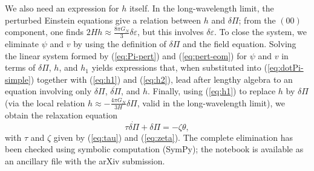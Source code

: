 \documentclass[aps,prd,reprint,superscriptaddress,floatfix]{revtex4-2}
\begin{document}
We also need an expression for $h$ itself. In the long-wavelength limit, the perturbed Einstein equations give a relation between $h$ and $\delta\Pi$; from the $(00)$ component, one finds $2H h \approx \frac{8\pi G_N}{3} \delta\varepsilon$, but this involves $\delta\varepsilon$. To close the system, we eliminate $\psi$ and $v$ by using the definition of $\delta\Pi$ and the field equation. Solving the linear system formed by (\ref{eq:Pi-pert}) and (\ref{eq:pert-eom}) for $\psi$ and $v$ in terms of $\delta\Pi$, $h$, and $h_1$ yields expressions that, when substituted into (\ref{eq:dotPi-simple}) together with (\ref{eq:h1}) and (\ref{eq:h2}), lead after lengthy algebra to an equation involving only $\delta\Pi$, $\dot{\delta\Pi}$, and $h$. Finally, using (\ref{eq:h1}) to replace $h$ by $\delta\Pi$ (via the local relation $h \approx -\frac{4\pi G_N}{3H}\delta\Pi$, valid in the long-wavelength limit), we obtain the relaxation equation
\begin{equation}
\tau \dot{\delta\Pi} + \delta\Pi = -\zeta \theta,
\end{equation}
with $\tau$ and $\zeta$ given by (\ref{eq:tau}) and (\ref{eq:zeta}). The complete elimination has been checked using symbolic computation (SymPy); the notebook is available as an ancillary file with the arXiv submission.

\end{document}

